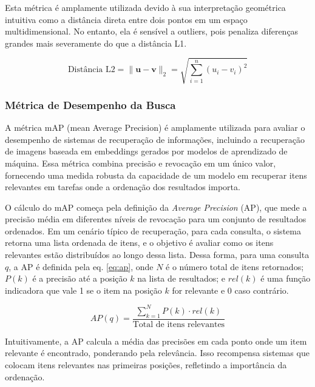 Esta métrica é amplamente utilizada devido à sua interpretação geométrica intuitiva como a distância direta entre dois pontos em um espaço multidimensional. No entanto, ela é sensível a outliers, pois penaliza diferenças grandes mais severamente do que a distância L1.

\begin{equation}\label{eq:l2}
  \text{Distância L2} = \|\mathbf{u} - \mathbf{v}\|_2 = \sqrt{\sum_{i=1}^n (u_i - v_i)^2}
\end{equation}





\subsubsection{Métrica de Desempenho da Busca}
\label{sec:metricas-map}
A métrica mAP (mean Average Precision) é amplamente utilizada para avaliar o desempenho de sistemas de recuperação de informações, incluindo a recuperação de imagens baseada em embeddings gerados por modelos de aprendizado de máquina. Essa métrica combina precisão e revocação em um único valor, fornecendo uma medida robusta da capacidade de um modelo em recuperar itens relevantes em tarefas onde a ordenação dos resultados importa.

O cálculo do mAP começa pela definição da \emph{Average Precision} (AP), que mede a precisão média em diferentes níveis de revocação para um conjunto de resultados ordenados. Em um cenário típico de recuperação, para cada consulta, o sistema retorna uma lista ordenada de itens, e o objetivo é avaliar como os itens relevantes estão distribuídos ao longo dessa lista. Dessa forma, para uma consulta \( q \), a AP é definida pela eq. \eqref{eq:ap}, onde \( N \) é o número total de itens retornados; \( P(k) \) é a precisão até a posição \( k \) na lista de resultados; e \( rel(k) \) é uma função indicadora que vale 1 se o item na posição \( k \) for relevante e 0 caso contrário.

\begin{equation}\label{eq:ap}
  AP(q) = \frac{\sum_{k=1}^N P(k) \cdot rel(k)}{\text{Total de itens relevantes}}
\end{equation}

Intuitivamente, a AP calcula a média das precisões em cada ponto onde um item relevante é encontrado, ponderando pela relevância. Isso recompensa sistemas que colocam itens relevantes nas primeiras posições, refletindo a importância da ordenação.

